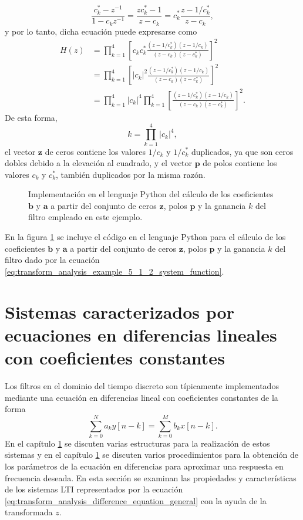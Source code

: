 \documentclass[a4paper]{report}
\newcommand{\z}{\mathbf{z}}
\begin{document}
\[
 \frac{c^*_k-z^{-1}}{1-c_kz^{-1}}=\frac{zc^*_k-1}{z-c_k}=c^*_k\frac{z-1/c^*_k}{z-c_k},
\]
y por lo tanto, dicha ecuación puede expresarse como
\begin{align*}
 H(z)&=\prod_{k=1}^4\left[c_kc^*_k\frac{(z-1/c^*_k)(z-1/c_k)}{(z-c_k)(z-c^*_k)}\right]^2\\
  &=\prod_{k=1}^4\left[|c_k|^2\frac{(z-1/c^*_k)(z-1/c_k)}{(z-c_k)(z-c^*_k)}\right]^2\\
  &=\prod_{k=1}^4|c_k|^4\prod_{k=1}^4\left[\frac{(z-1/c^*_k)(z-1/c_k)}{(z-c_k)(z-c^*_k)}\right]^2. 
\end{align*}
De esta forma,
\[
 k=\prod_{k=1}^4|c_k|^4,
\]
el vector \(\z\) de ceros contiene los valores \(1/c_k\) y \(1/c^*_k\) duplicados, ya que son ceros dobles debido a la elevación al cuadrado, y el vector \(\mathbf{p}\) de polos contiene los valores \(c_k\) y \(c^*_k\), también duplicados por la misma razón.
\begin{figure}
\begin{center}

\caption{\label{fig:transform_analysis_filter_ba_coefs_from_zpk} Implementación en el lenguaje Python del cálculo de los coeficientes \(\mathbf{b}\) y \(\mathbf{a}\) a partir del conjunto de ceros \(\z\), polos \(\mathbf{p}\) y la ganancia \(k\) del filtro empleado en este ejemplo.}
\end{center}
\end{figure}
En la figura \ref{fig:transform_analysis_filter_ba_coefs_from_zpk} se incluye el código en el lenguaje Python para el cálculo de los coeficientes \(\mathbf{b}\) y \(\mathbf{a}\) a partir del conjunto de ceros \(\z\), polos \(\mathbf{p}\) y la ganancia \(k\) del filtro dado por la ecuación \ref{eq:transform_analysis_example_5_1_2_system_function}.

\section{Sistemas caracterizados por ecuaciones en diferencias lineales con coeficientes constantes}

Los filtros en el dominio del tiempo discreto son típicamente implementados mediante una ecuación en diferencias lineal con coeficientes constantes de la forma
\begin{equation}\label{eq:transform_analysis_difference_equation_general}
 \sum_{k=0}^Na_ky[n-k]=\sum_{k=0}^Mb_kx[n-k]. 
\end{equation}
En el capítulo \ref{} se discuten varias estructuras para la realización de estos sistemas y en el capítulo \ref{} se discuten varios procedimientos para la obtención de los parámetros de la ecuación en diferencias para aproximar una respuesta en frecuencia deseada. En esta sección se examinan las propiedades y características de los sistemas LTI representados por la ecuación \ref{eq:transform_analysis_difference_equation_general} con la ayuda de la transformada \(z\).
\end{document}
